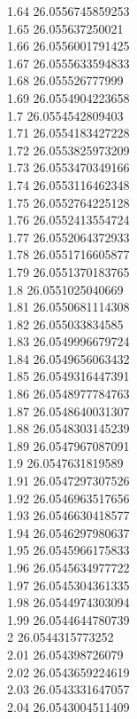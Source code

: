 {1.64	26.0556745859253\\
1.65	26.055637250021\\
1.66	26.0556001791425\\
1.67	26.0555633594833\\
1.68	26.055526777999\\
1.69	26.0554904223658\\
1.7	26.0554542809403\\
1.71	26.0554183427228\\
1.72	26.0553825973209\\
1.73	26.0553470349166\\
1.74	26.0553116462348\\
1.75	26.0552764225128\\
1.76	26.0552413554724\\
1.77	26.0552064372933\\
1.78	26.0551716605877\\
1.79	26.0551370183765\\
1.8	26.0551025040669\\
1.81	26.0550681114308\\
1.82	26.055033834585\\
1.83	26.0549996679724\\
1.84	26.0549656063432\\
1.85	26.0549316447391\\
1.86	26.0548977784763\\
1.87	26.0548640031307\\
1.88	26.0548303145239\\
1.89	26.0547967087091\\
1.9	26.0547631819589\\
1.91	26.0547297307526\\
1.92	26.0546963517656\\
1.93	26.0546630418577\\
1.94	26.0546297980637\\
1.95	26.0545966175833\\
1.96	26.0545634977722\\
1.97	26.0545304361335\\
1.98	26.0544974303094\\
1.99	26.0544644780739\\
2	26.0544315773252\\
2.01	26.054398726079\\
2.02	26.0543659224619\\
2.03	26.0543331647057\\
2.04	26.0543004511409\\
}
